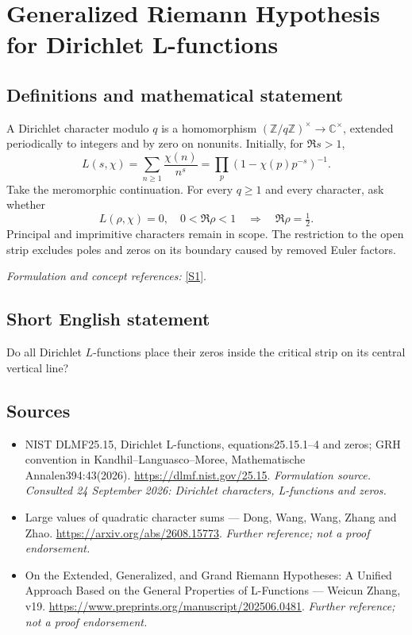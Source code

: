 \documentclass[11pt]{article}
\begin{document}
\section*{\texorpdfstring{Generalized Riemann Hypothesis for Dirichlet L-functions}{Generalized Riemann Hypothesis for Dirichlet L-functions}}\label{30006676}
\subsection{Definitions and mathematical statement}
A Dirichlet character modulo $q$ is a homomorphism $({\mathbb{Z}}/q{\mathbb{Z}})^\times\to{\mathbb{C}}^\times$, extended periodically to integers and by zero on nonunits. Initially, for $\Re s>1$,
\[
 L(s,\chi)=\sum_{n\ge1}\frac{\chi(n)}{n^s}=\prod_p(1-\chi(p)p^{-s})^{-1}.
\]
Take the meromorphic continuation. For every $q\ge1$ and every character, ask whether
\[
 L(\rho,\chi)=0,\quad0<\Re\rho<1\quad\Longrightarrow\quad\Re\rho=\tfrac12.
\]
Principal and imprimitive characters remain in scope. The restriction to the open strip excludes poles and zeros on its boundary caused by removed Euler factors.
\par\smallskip\textit{Formulation and concept references:} \href{https://dlmf.nist.gov/25.15}{[S1]}.

\subsection{Short English statement}
Do all Dirichlet $L$-functions place their zeros inside the critical strip on its central vertical line?
\subsection{Sources}
\begin{itemize}
\item[S1]NIST DLMF25.15, Dirichlet L-functions, equations25.15.1–4 and zeros; GRH convention in Kandhil–Languasco–Moree, Mathematische Annalen394:43(2026).
\url{https://dlmf.nist.gov/25.15}.
\textit{Formulation source. Consulted 24 September 2026: Dirichlet characters, L-functions and zeros.}
\item[S2]Large values of quadratic character sums — Dong, Wang, Wang, Zhang and Zhao.
\url{https://arxiv.org/abs/2608.15773}.
\textit{Further reference; not a proof endorsement.}
\item[S3]On the Extended, Generalized, and Grand Riemann Hypotheses: A Unified Approach Based on the General Properties of L-Functions — Weicun Zhang, v19.
\url{https://www.preprints.org/manuscript/202506.0481}.
\textit{Further reference; not a proof endorsement.}
\end{itemize}
\end{document}
